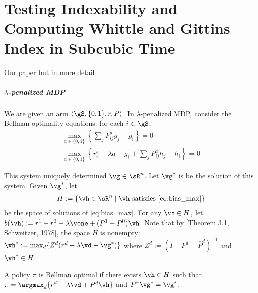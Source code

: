 \chapter{Testing Indexability and Computing Whittle and Gittins Index in Subcubic Time}
\label{ch:index_computation}

Our paper but in more detail

\paragraph{$\lambda$-penalized MDP}

We are given an arm $\langle\gS,\{0,1\},r,P\rangle$. In $\lambda$-penalized MDP, consider the Bellman optimality equations: for each $i\in\gS$,
\begin{align}
    \max_{a\in\{0,1\}}{\left\{\sum_jP^a_{ij}g_j-g_i\right\}} =0 \label{eq:gain_max}\\
\max_{a\in\{0,1\}}{\left\{r^a_i-\lambda a-g_i +\sum_jP^a_{ij}h_j-h_i\right\}} =0 \label{eq:bias_max}
\end{align}

This system uniquely determined $\vg\in\sR^n$.
Let $\vg^*$ is be the solution of this system. Given $\vg^*$, let
\begin{align}
H:=\{\vh\in \sR^n \mid \vh \text{ satisfies } \eqref{eq:bias_max}\}
\end{align}
be the space of solutions of \eqref{eq:bias_max}.
For any $\vh\in H$, let $b(\vh):=r^1-r^0-\lambda \vone +(P^1-P^0)\vh$. 
Note that by [Theorem 3.1, Schweitzer, 1978], the space $H$ is nonempty: $\vh^*:=\max_d\{Z^d(r^d -\lambda \vd -\vg^*)\}$ where $Z^d:=(I-P^d +\bar{P}^d)^{-1}$ and $\vh^*\in H$.

\begin{defn}
\label{defn:BO_policy}
A policy $\pi$ is Bellman optimal if there exists $\vh\in H$ such that $\pi=\argmax_d\{r^d -\lambda \vd +P^d\vh\}$ and $P^\pi\vg^*=\vg^*$.
\end{defn}

